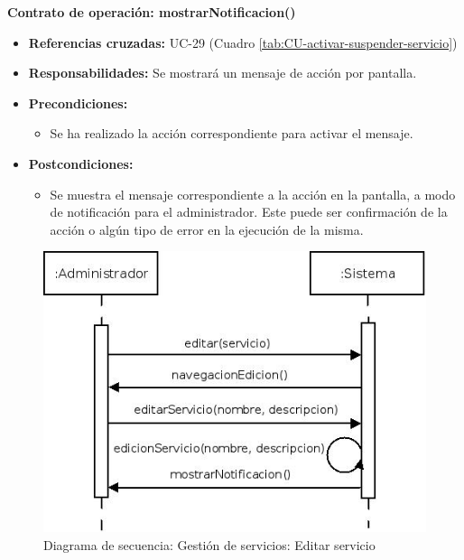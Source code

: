 \textbf{Contrato de operación: mostrarNotificacion()}
\begin{itemize}
\item \textbf{Referencias cruzadas:} UC-29 (Cuadro \ref{tab:CU-activar-suspender-servicio})
\item \textbf{Responsabilidades:} Se mostrará un mensaje de acción por pantalla.
\item \textbf{Precondiciones:} 
 \begin{itemize}
\item Se ha realizado la acción correspondiente para activar el mensaje.
\end {itemize}
\item \textbf{Postcondiciones:} 
 \begin{itemize}
\item Se muestra el mensaje correspondiente a la acción en la pantalla, a modo de notificación para el administrador. Este puede ser confirmación de la acción o algún tipo de error en la ejecución de la misma.
\end {itemize}
\end {itemize}


\vspace{7mm}
\dotfill
\vspace{7mm}

\begin{figure}[h!]
\centering
  \includegraphics[scale=.55]{img/secuencias/gestion-servicios-editar-servicio.jpeg}
  \caption{Diagrama de secuencia: Gestión de servicios: Editar servicio}
  \label{fig:secuencia-gestion-servicios-editar-servicio}
\end{figure}

